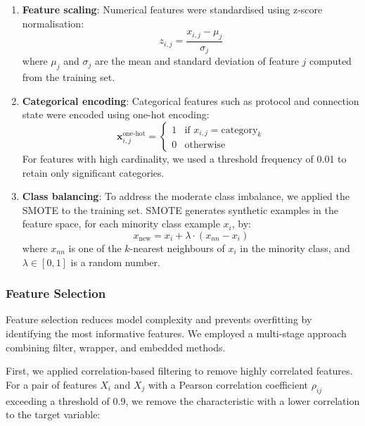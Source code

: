 \begin{enumerate}
    \item \textbf{Feature scaling}: Numerical features were standardised using z-score normalisation:
    \begin{equation}
        z_{i,j} = \frac{x_{i,j} - \mu_j}{\sigma_j}
    \end{equation}
    where $\mu_j$ and $\sigma_j$ are the mean and standard deviation of feature $j$ computed from the training set.
    
    \item \textbf{Categorical encoding}: Categorical features such as protocol and connection state were encoded using one-hot encoding:
    \begin{equation}
        \mathbf{x}^{\text{one-hot}}_{i,j} = 
        \begin{cases}
            1 & \text{if } x_{i,j} = \text{category}_k \\
            0 & \text{otherwise}
        \end{cases}
    \end{equation}
    For features with high cardinality, we used a threshold frequency of 0.01 to retain only significant categories.
    
    \item \textbf{Class balancing}: To address the moderate class imbalance, we applied the SMOTE to the training set. SMOTE generates synthetic examples in the feature space, for each minority class example $x_i$, by:
    \begin{equation}
        x_{\text{new}} = x_i + \lambda \cdot (x_{nn} - x_i)
    \end{equation}
    where $x_{nn}$ is one of the $k$-nearest neighbours of $x_i$ in the minority class, and $\lambda \in [0,1]$ is a random number.
\end{enumerate}

\subsubsection{Feature Selection}

Feature selection reduces model complexity and prevents overfitting by identifying the most informative features. We employed a multi-stage approach combining filter, wrapper, and embedded methods.

First, we applied correlation-based filtering to remove highly correlated features. For a pair of features $X_i$ and $X_j$ with a Pearson correlation coefficient $\rho_{ij}$ exceeding a threshold of 0.9, we remove the characteristic with a lower correlation to the target variable:

